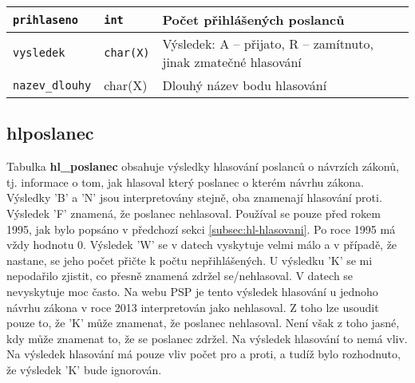 \begin{center}
\begin{longtable}{|l|l|p{7cm}|}
		\hline 
		
		\lstinline|prihlaseno| & \lstinline|int| & Počet přihlášených poslanců
		\\
		
		\hline 
		
		\lstinline|vysledek| & \lstinline|char(X)|	 & Výsledek: A -- přijato, R -- zamítnuto, jinak zmatečné hlasování
		\\
		
		\hline 
		
		\lstinline|nazev_dlouhy| & char(X)	 & Dlouhý název bodu hlasování
		\\
		
		\hline 
		
	\end{longtable}
\end{center}

\subsection*{hl\textunderscore poslanec}

Tabulka \textbf{hl\_poslanec} obsahuje výsledky hlasování poslanců o návrzích zákonů, tj. informace \linebreak o tom, jak hlasoval který poslanec o kterém návrhu zákona. Výsledky 'B' a 'N' jsou interpretovány stejně, oba znamenají hlasování proti. Výsledek 'F' znamená, že poslanec nehlasoval. Používal se pouze před rokem 1995, jak bylo popsáno v předchozí sekci \ref{subsec:hl-hlasovani}. Po roce 1995 má vždy hodnotu 0. Výsledek 'W' se v datech vyskytuje velmi málo a v případě, že nastane, se jeho počet přičte k počtu nepřihlášených. U výsledku 'K' se mi nepodařilo zjistit, co přesně znamená \linebreak zdržel se/nehlasoval. V datech se nevyskytuje moc často. Na webu PSP je tento výsledek hlasování u jednoho návrhu zákona v roce 2013 interpretován jako nehlasoval. Z toho lze usoudit pouze to, že 'K' může znamenat, že poslanec nehlasoval. Není však z toho jasné, kdy může znamenat to, že se poslanec zdržel. Na výsledek hlasování to nemá vliv. Na výsledek hlasování má pouze vliv počet pro a proti, a tudíž bylo rozhodnuto, že výsledek 'K' bude ignorován. 

\newpage

